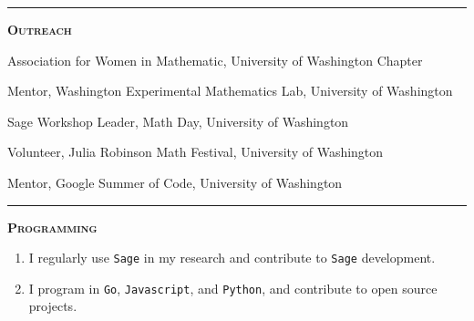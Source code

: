 \documentclass[12pt]{article}
\newcommand{\sectionheading}[1]
{
\bigskip %
\noindent
\hspace{-6.5mm}\textcolor{Gray}{\rule[.75mm]{21.5mm}{1mm}} %
\hspace{.2mm}	%
{\large{\textbf{\textsc{#1}}}} %
}
\newenvironment{date_section}
	{
	\vspace{-1ex}
	\leftmargini = 15ex
		\begin{itemize}[
			labelsep = *,
			labelwidth = 9ex,
			labelindent = 0ex,
			itemindent = !,
			font=\normalfont,
			align=parleft
		]{}
		\itemsep=-1.5mm
	}
	{\end{itemize}\vspace{-2ex}}
\newcommand{\yearmo}[2]{
	\item[
		{\makebox[1ex][r]{#1}}
		\hspace{1ex}
		{\makebox[1ex][l]{#2} }
		] }
\newcommand{\yearrange}[2]{
	\item[
		{\makebox[1ex][r]{#1}}
		--
		{\makebox[1ex][l]{#2} }
		] }
\begin{document}
	\sectionheading{Outreach}%

		\begin{date_section}
			
			\yearrange{2015}{2018}
				Association for Women in Mathematic,
				University of Washington Chapter
			
			\yearrange{2016}{2017}
				Mentor,
				Washington Experimental Mathematics Lab,
				University of Washington
				
			\yearmo{}{2017} %
				Sage Workshop Leader,
				Math Day,
				University of Washington
				
			\yearmo{}{2017} %
				Volunteer,
				Julia Robinson Math Festival,
				University of Washington

			\yearmo{}{2016} %
				Mentor,
				Google Summer of Code,
				University of Washington

%			
%
%
%
%

		\end{date_section}


	\sectionheading{Programming}%
	
        \vspace{1ex}
        
        \begin{enumerate}[label=$\bullet$]
        	\item I regularly use {\tt Sage} in my research and contribute to {\tt Sage} development.
        	\item I program in {\tt Go}, {\tt Javascript}, and {\tt Python}, and contribute to open source projects. 
        \end{enumerate}

\end{document}
